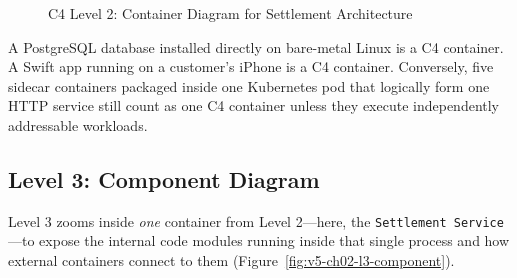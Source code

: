 \begin{figure}[htbp]
\caption{C4 Level 2: Container Diagram for Settlement Architecture}
\label{fig:v5-ch02-l2-container}
\end{figure}

\begin{commonmistakebox}
A PostgreSQL database installed directly on bare-metal Linux is a C4 container. A Swift app running on a customer's iPhone is a C4 container. Conversely, five sidecar containers packaged inside one Kubernetes pod that logically form one HTTP service still count as one C4 container unless they execute independently addressable workloads.
\end{commonmistakebox}

\subsection{Level 3: Component Diagram}

Level 3 zooms inside \emph{one} container from Level 2---here, the \texttt{Settlement Service}---to expose the internal code modules running inside that single process and how external containers connect to them (Figure~\ref{fig:v5-ch02-l3-component}).

